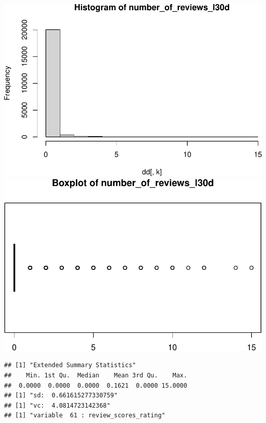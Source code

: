 \includegraphics{anal_files/figure-latex/unnamed-chunk-7-44.pdf}
\includegraphics{anal_files/figure-latex/unnamed-chunk-7-45.pdf}

\begin{verbatim}
## [1] "Extended Summary Statistics"
##    Min. 1st Qu.  Median    Mean 3rd Qu.    Max. 
##  0.0000  0.0000  0.0000  0.1621  0.0000 15.0000 
## [1] "sd:  0.661615277330759"
## [1] "vc:  4.0814723142368"
## [1] "variable  61 : review_scores_rating"
\end{verbatim}

